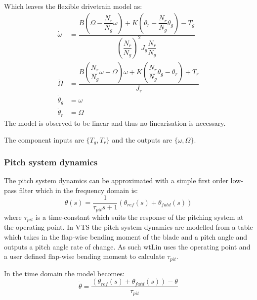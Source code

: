 Which leaves the flexible drivetrain model as:
\begin{align} 
	\dot{\omega} & = \dfrac{B \left(\Omega - \dfrac{N_r}{N_g}\omega\right) + K\left(\theta_r - \dfrac{N_r}{N_g} \theta_{g}\right) - T_{g}}{\left(\dfrac{N_r}{N_g}\right)^2 J_{g} \dfrac{N_r}{N_g} } \label{eq:comp_comp_drivetrain_flex_mod_1} \\
	\dot{\Omega} & = \dfrac{B \left(\dfrac{N_r}{N_g}\omega - \Omega \right) \omega + K\left(\dfrac{N_r}{N_g} \theta_{g} - \theta_r\right) + T_{r}}{J_{r}} \label{eq:comp_comp_drivetrain_flex_mod_2} \\
		\dot{\theta}_g & = \omega \\
		\dot{\theta}_r & = \Omega
\end{align}
The model is observed to be linear and thus no linearisation is necessary.

The component inputs are $ \{T_g, T_r\} $ and the outputs are $ \{\omega, \Omega\} $. 

\subsubsection{Pitch system dynamics} \label{sec:comp_pitch_dyn}
The pitch system dynamics can be approximated with a simple first order low-pass filter which in the frequency domain is:
\begin{equation}\label{eq:comp_pitch_freq_dyn}
	\theta(s) = \dfrac{1}{\tau_{pit} s + 1} (\theta_{ref}(s) + \theta_{fatd}(s))
\end{equation}
where $ \tau_{pit} $ is a time-constant which suits the response of the pitching system at the operating point. In VTS the pitch system dynamics are modelled from a table which takes in the flap-wise bending moment of the blade and a pitch angle and outputs a pitch angle rate of change. As such wtLin uses the operating point and a user defined flap-wise bending moment to calculate $ \tau_{pit} $.

In the time domain the model becomes:
\begin{equation}\label{eq:comp_pitch_time}
	\dot{\theta} =\dfrac{(\theta_{ref}(s) + \theta_{fatd}(s)) - \theta}{\tau_{pit}}
\end{equation}

